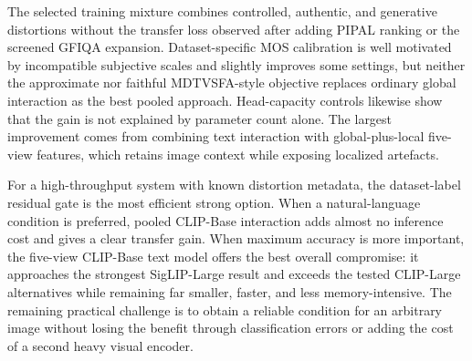 \documentclass{article}
\begin{document}
The selected training mixture combines controlled, authentic, and generative distortions without the transfer loss observed after adding PIPAL ranking or the screened GFIQA expansion. Dataset-specific MOS calibration is well motivated by incompatible subjective scales and slightly improves some settings, but neither the approximate nor faithful MDTVSFA-style objective replaces ordinary global interaction as the best pooled approach. Head-capacity controls likewise show that the gain is not explained by parameter count alone. The largest improvement comes from combining text interaction with global-plus-local five-view features, which retains image context while exposing localized artefacts.

For a high-throughput system with known distortion metadata, the dataset-label residual gate is the most efficient strong option. When a natural-language condition is preferred, pooled CLIP-Base interaction adds almost no inference cost and gives a clear transfer gain. When maximum accuracy is more important, the five-view CLIP-Base text model offers the best overall compromise: it approaches the strongest SigLIP-Large result and exceeds the tested CLIP-Large alternatives while remaining far smaller, faster, and less memory-intensive. The remaining practical challenge is to obtain a reliable condition for an arbitrary image without losing the benefit through classification errors or adding the cost of a second heavy visual encoder.
\end{document}
